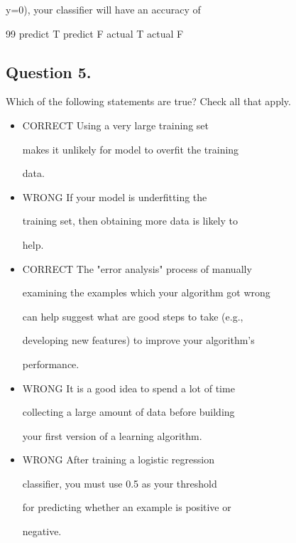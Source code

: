 \documentclass[11pt]{article} %
\begin{document}
y=0), your classifier will have an accuracy of

99%
             predict T	predict F
actual T	
actual F

\subsection*{Question 5.}

Which of the following statements are true? Check all that apply.

\begin{itemize}
\item CORRECT Using a very large training set
	
	makes it unlikely for model to overfit the training
	
	data.
	
	
\item 	WRONG If your model is underfitting the
	
	training set, then obtaining more data is likely to
	
	help.
	
\item 	CORRECT The "error analysis" process of manually
	
	examining the examples which your algorithm got wrong
	
	can help suggest what are good steps to take (e.g.,
	
	developing new features) to improve your algorithm's
	
	performance.
	
	
	
\item	WRONG It is a good idea to spend a lot of time
	
	collecting a large amount of data before building
	
	your first version of a learning algorithm.
	
	
	
\item WRONG After training a logistic regression
	
	classifier, you must use 0.5 as your threshold
	
	for predicting whether an example is positive or
	
	negative.
\end{itemize}
\end{document}

